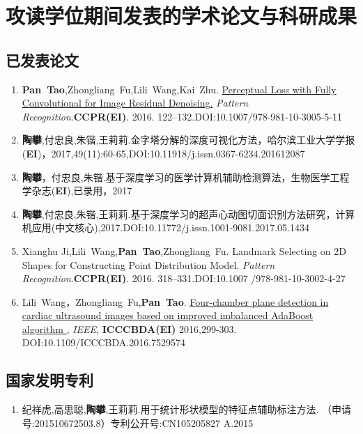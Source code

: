 
\chapter{攻读学位期间发表的学术论文与科研成果}

\section*{已发表论文}
\begin{enumerate}

\item {\textbf{Pan~Tao},Zhongliang~Fu,Lili~Wang,Kai~Zhu.
{\href{http://link.springer.com/10.1007/978-981-10-3005-5_11}
{Perceptual Loss with Fully Convolutional for Image Residual Denoising.}
{ \textit{Pattern Recognition}}.\textbf{CCPR(EI)}. 2016. 122--132.DOI:10.1007/978-981-10-3005-5-11}}

\item {\textbf{陶攀},付忠良,朱锴,王莉莉.{金字塔分解的深度可视化方法}，{哈尔滨工业大学学报(\textbf{EI})}，2017,49(11):60-65,DOI:10.11918/j.issn.0367-6234.201612087}

\item{\textbf{陶攀}，付忠良,朱锴.{基于深度学习的医学计算机辅助检测算法}，{生物医学工程学杂志(\textbf{EI}),已录用}，2017}
\item {\textbf{陶攀},付忠良,朱锴,王莉莉.{基于深度学习的超声心动图切面识别方法研究}，{计算机应用(中文核心),2017.DOI:10.11772/j.issn.1001-9081.2017.05.1434} }

\item{Xianghu Ji,Lili~Wang,\textbf{Pan~Tao},Zhongliang~Fu.
{{Landmark Selecting on 2D Shapes for Constructing Point Distribution Model.}
{ \textit{Pattern Recognition}}.\textbf{CCPR(EI)}. 2016. 318--331.DOI:10.1007
/978-981-10-3002-4-27}}

\item {Lili~Wang，Zhongliang~Fu,\textbf{Pan~Tao}.
{\href{http://ieeexplore.ieee.org
/document/7529574}
{Four-chamber plane detection in cardiac
ultrasound images based on improved imbalanced AdaBoost algorithm },
{ \textit{IEEE}},
\textbf{ICCCBDA(EI)} 2016,299-303.
DOI:10.1109/ICCCBDA.2016.7529574}}

\end{enumerate}
\section*{国家发明专利}
\begin{enumerate}
\item { 纪祥虎,高思聪,\textbf{陶攀},王莉莉.{用于统计形状模型的特征点辅助标注方法. {（申请号:201510672503.8）专利公开号:CN105205827 A}.{2015}}}
\end{enumerate}
